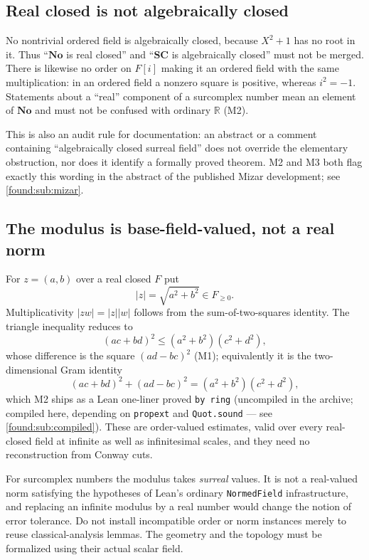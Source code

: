 \documentclass[11pt,letterpaper]{article}
\numberwithin{equation}{section}
\theoremstyle{definition}
\theoremstyle{remark}
\newcommand{\No}{\mathbf{No}}
\newcommand{\SC}{\mathbf{SC}}
\newcommand{\R}{\mathbb R}
\begin{document}
\subsection{Real closed is not algebraically closed}
\label{found:sub:realclosed}
No nontrivial ordered field is algebraically closed, because $X^2+1$ has no root
in it. Thus ``$\No$ is real closed'' and ``$\SC$ is algebraically closed'' must
not be merged. There is likewise no order on $F[i]$ making it an ordered field
with the same multiplication: in an ordered field a nonzero square is positive,
whereas $i^2=-1$. Statements about a ``real'' component of a surcomplex number
mean an element of $\No$ and must not be confused with ordinary $\R$ (M2).

This is also an audit rule for documentation: an abstract or a comment
containing ``algebraically closed surreal field'' does not override the
elementary obstruction, nor does it identify a formally proved theorem. M2 and
M3 both flag exactly this wording in the abstract of the published Mizar
development; see \cref{found:sub:mizar}.

\subsection{The modulus is base-field-valued, not a real norm}
\label{found:sub:modulus}
For $z=(a,b)$ over a real closed $F$ put
\[
 |z|=\sqrt{a^2+b^2}\in F_{\ge0}.
\]
Multiplicativity $|zw|=|z||w|$ follows from the sum-of-two-squares identity. The
triangle inequality reduces to
\begin{equation}\label{found:eq:cauchyschwarz}
 (ac+bd)^2\le(a^2+b^2)(c^2+d^2),
\end{equation}
whose difference is the square $(ad-bc)^2$ (M1); equivalently it is the
two-dimensional Gram identity
\begin{equation}\label{found:eq:gram}
 (ac+bd)^2+(ad-bc)^2=(a^2+b^2)(c^2+d^2),
\end{equation}
which M2 ships as a Lean one-liner proved \texttt{by ring} (uncompiled in the
archive; compiled here, depending on \texttt{propext} and \texttt{Quot.sound}
--- see \cref{found:sub:compiled}). These are order-valued estimates, valid over every
real-closed field at infinite as well as infinitesimal scales, and they need no
reconstruction from Conway cuts.

For surcomplex numbers the modulus takes \emph{surreal} values. It is not a
real-valued norm satisfying the hypotheses of Lean's ordinary
\texttt{NormedField} infrastructure, and replacing an infinite modulus by a real
number would change the notion of error tolerance. Do not install incompatible
order or norm instances merely to reuse classical-analysis lemmas. The geometry
and the topology must be formalized using their actual scalar field.
\end{document}
